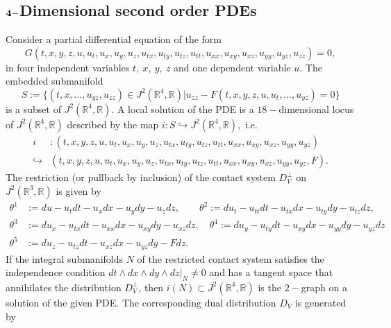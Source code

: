 \documentclass[a4paper, 11pt]{amsart}
\theoremstyle{definition}
\begin{document}
\subsection{${\bf{4-}}$Dimensional second order PDEs}
Consider a partial differential equation of the form
\begin{equation}
  G(t,x,y,z,u,u_t,u_x,u_y,u_z,u_{tx},u_{ty},u_{tz},u_{tt},u_{xx},u_{xy},u_{xz},u_{yy},u_{yz},u_{zz})=0,
\end{equation}
in four independent variables $t,~x,~y,~z$ and one dependent variable $u.$
The embedded submanifold
\[S:=\{(t,x,\ldots,u_{yz},u_{zz})\in J^2({\mathbb{R}}^4,{\mathbb{R}}) | u_{zz}-F(t,x,y,z,u,u_t,\ldots,u_{yz})=0\}\]
is a subset of $J^2({\mathbb{R}}^4,{\mathbb{R}}).$ A local solution of the PDE is a $18-$dimensional locus of $J^2({\mathbb{R}}^4,{\mathbb{R}})$ described by the map $i:S\hookrightarrow J^2({\mathbb{R}}^4,{\mathbb{R}}),$ i.e. \begin{align*}
  i&:(t,x,y,z,u,u_t,u_x,u_y,u_z,u_{tx},u_{ty},u_{tz},u_{tt},u_{xx},u_{xy},u_{xz},u_{yy},u_{yz})\\ \hookrightarrow & (t,x,y,z,u,u_t,u_x,u_y,u_z,u_{tx},u_{ty},u_{tz},u_{tt},u_{xx},u_{xy},u_{xz},u_{yy},u_{yz},F).
\end{align*}
The restriction (or pullback by inclusion) of the contact system $D^{\perp}_V$ on $J^2({\mathbb{R}}^3,{\mathbb{R}})$ is given by
\begin{align}
\theta^1&:=du-u_tdt-u_xdx-u_ydy-u_zdz, \quad\quad \theta^2:=du_t-u_{tt}dt-u_{tx}dx-u_{ty}dy-u_{tz}dz,\nonumber\\
 \theta^3&:=du_x-u_{tx}dt-u_{xx}dx-u_{xy}dy-u_{xz}dz,\quad \theta^4:=du_y-u_{ty}dt-u_{xy}d x-u_{yy}dy-u_{yz}dz\label{4contact dist} \\
 \theta^5&:=du_z-u_{tz}dt-u_{xz}d x-u_{yz}dy-Fdz. \nonumber
 \end{align}
If the integral submanifolds $N$ of the restricted contact system satisfies the independence condition $dt\wedge dx\wedge dy\wedge dz| _N \neq 0$ and has a tangent space that annihilates the distribution $D^{\perp}_V$, then $i(N) \subset  J^2({\mathbb{R}}^4,{\mathbb{R}})$ is the $2-$graph on a solution of the given PDE. The corresponding dual distribution $D_V$ is generated by
\end{document}
